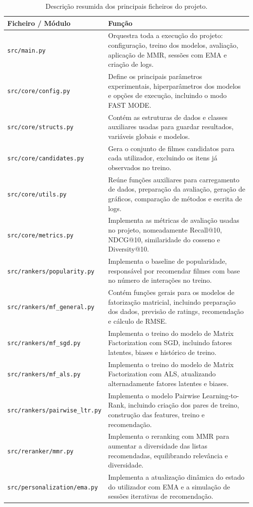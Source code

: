 \begin{table}[H]
\centering
\small
\renewcommand{\arraystretch}{1.35}
\begin{tabular}{p{} p{}}
\toprule
\textbf{Ficheiro / Módulo} & \textbf{Função} \\
\midrule
\texttt{src/main.py} & Orquestra toda a execução do projeto: configuração, treino dos modelos, avaliação, aplicação de MMR, sessões com EMA e criação de logs. \\
\texttt{src/core/config.py} & Define os principais parâmetros experimentais, hiperparâmetros dos modelos e opções de execução, incluindo o modo FAST MODE. \\
\texttt{src/core/structs.py} & Contém as estruturas de dados e classes auxiliares usadas para guardar resultados, variáveis globais e modelos. \\
\texttt{src/core/candidates.py} & Gera o conjunto de filmes candidatos para cada utilizador, excluindo os itens já observados no treino. \\
\texttt{src/core/utils.py} & Reúne funções auxiliares para carregamento de dados, preparação da avaliação, geração de gráficos, comparação de métodos e escrita de logs. \\
\texttt{src/core/metrics.py} & Implementa as métricas de avaliação usadas no projeto, nomeadamente Recall@10, NDCG@10, similaridade do cosseno e Diversity@10. \\
\texttt{src/rankers/popularity.py} & Implementa o baseline de popularidade, responsável por recomendar filmes com base no número de interações no treino. \\
\texttt{src/rankers/mf\_general.py} & Contém funções gerais para os modelos de fatorização matricial, incluindo preparação dos dados, previsão de ratings, recomendação e cálculo de RMSE. \\
\texttt{src/rankers/mf\_sgd.py} & Implementa o treino do modelo de Matrix Factorization com SGD, incluindo fatores latentes, biases e histórico de treino. \\
\texttt{src/rankers/mf\_als.py} & Implementa o treino do modelo de Matrix Factorization com ALS, atualizando alternadamente fatores latentes e biases. \\
\texttt{src/rankers/pairwise\_ltr.py} & Implementa o modelo Pairwise Learning-to-Rank, incluindo criação dos pares de treino, construção das features, treino e recomendação. \\
\texttt{src/reranker/mmr.py} & Implementa o reranking com MMR para aumentar a diversidade das listas recomendadas, equilibrando relevância e diversidade. \\
\texttt{src/personalization/ema.py} & Implementa a atualização dinâmica do estado do utilizador com EMA e a simulação de sessões iterativas de recomendação. \\
\bottomrule
\end{tabular}
\caption{Descrição resumida dos principais ficheiros do projeto.}
\label{tab:estrutura_ficheiros}
\end{table}